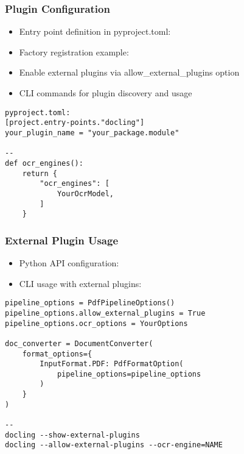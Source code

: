 \begin{frame}[fragile]\frametitle{Plugin Configuration}
    \begin{itemize}
	\item Entry point definition in pyproject.toml:
	\item Factory registration example:
	\item Enable external plugins via allow\_external\_plugins option
	\item CLI commands for plugin discovery and usage
	\end{itemize}
	  
\begin{lstlisting}
pyproject.toml:
[project.entry-points."docling"]
your_plugin_name = "your_package.module"

--
def ocr_engines():
    return {
        "ocr_engines": [
            YourOcrModel,
        ]
    }
\end{lstlisting}	  
\end{frame}

\begin{frame}[fragile]\frametitle{External Plugin Usage}
    \begin{itemize}
	\item Python API configuration:
	\item CLI usage with external plugins:
	\end{itemize}
	
\begin{lstlisting}
pipeline_options = PdfPipelineOptions()
pipeline_options.allow_external_plugins = True
pipeline_options.ocr_options = YourOptions

doc_converter = DocumentConverter(
    format_options={
        InputFormat.PDF: PdfFormatOption(
            pipeline_options=pipeline_options
        )
    }
)

--
docling --show-external-plugins
docling --allow-external-plugins --ocr-engine=NAME
\end{lstlisting}
\end{frame}

